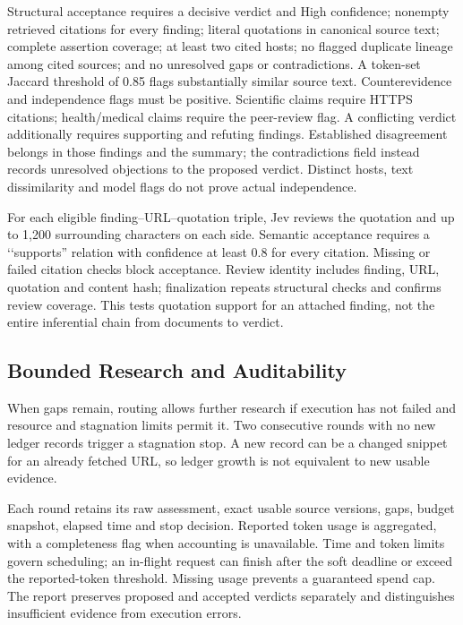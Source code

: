 \documentclass[conference]{IEEEtran}
\begin{document}
Structural acceptance requires a decisive verdict and High confidence; nonempty retrieved citations for every finding; literal quotations in canonical source text; complete assertion coverage; at least two cited hosts; no flagged duplicate lineage among cited sources; and no unresolved gaps or contradictions. A token-set Jaccard threshold of 0.85 flags substantially similar source text. Counterevidence and independence flags must be positive. Scientific claims require HTTPS citations; health/medical claims require the peer-review flag. A conflicting verdict additionally requires supporting and refuting findings. Established disagreement belongs in those findings and the summary; the contradictions field instead records unresolved objections to the proposed verdict. Distinct hosts, text dissimilarity and model flags do not prove actual independence.

For each eligible finding--URL--quotation triple, Jev reviews the quotation and up to 1,200 surrounding characters on each side. Semantic acceptance requires a \lq\lq supports'' relation with confidence at least 0.8 for every citation. Missing or failed citation checks block acceptance. Review identity includes finding, URL, quotation and content hash; finalization repeats structural checks and confirms review coverage. This tests quotation support for an attached finding, not the entire inferential chain from documents to verdict.

\subsection{Bounded Research and Auditability}
When gaps remain, routing allows further research if execution has not failed and resource and stagnation limits permit it. Two consecutive rounds with no new ledger records trigger a stagnation stop. A new record can be a changed snippet for an already fetched URL, so ledger growth is not equivalent to new usable evidence.

Each round retains its raw assessment, exact usable source versions, gaps, budget snapshot, elapsed time and stop decision. Reported token usage is aggregated, with a completeness flag when accounting is unavailable. Time and token limits govern scheduling; an in-flight request can finish after the soft deadline or exceed the reported-token threshold. Missing usage prevents a guaranteed spend cap. The report preserves proposed and accepted verdicts separately and distinguishes insufficient evidence from execution errors.
\end{document}
